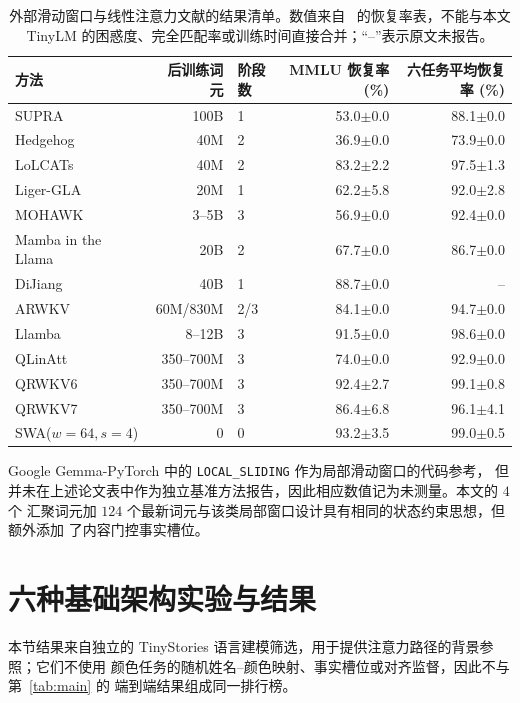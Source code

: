 \documentclass[letterpaper]{article}
\begin{document}
\begin{table}[t]
\centering
\scriptsize
\caption{外部滑动窗口与线性注意力文献的结果清单。数值来自~\cite{jolicoeur2026sliding} 的恢复率表，不能与本文 TinyLM 的困惑度、完全匹配率或训练时间直接合并；“--”表示原文未报告。}
\label{tab:external-swa-list}
\begin{tabular}{l r l r r}
\toprule
方法 & 后训练词元 & 阶段数 & MMLU 恢复率 (\%) & 六任务平均恢复率 (\%) \\
\midrule
SUPRA & 100B & 1 & 53.0$\pm$0.0 & 88.1$\pm$0.0 \\
Hedgehog & 40M & 2 & 36.9$\pm$0.0 & 73.9$\pm$0.0 \\
LoLCATs & 40M & 2 & 83.2$\pm$2.2 & 97.5$\pm$1.3 \\
Liger-GLA & 20M & 1 & 62.2$\pm$5.8 & 92.0$\pm$2.8 \\
MOHAWK & 3--5B & 3 & 56.9$\pm$0.0 & 92.4$\pm$0.0 \\
Mamba in the Llama & 20B & 2 & 67.7$\pm$0.0 & 86.7$\pm$0.0 \\
DiJiang & 40B & 1 & 88.7$\pm$0.0 & -- \\
ARWKV & 60M/830M & 2/3 & 84.1$\pm$0.0 & 94.7$\pm$0.0 \\
Llamba & 8--12B & 3 & 91.5$\pm$0.0 & 98.6$\pm$0.0 \\
QLinAtt & 350--700M & 3 & 74.0$\pm$0.0 & 92.9$\pm$0.0 \\
QRWKV6 & 350--700M & 3 & 92.4$\pm$2.7 & 99.1$\pm$0.8 \\
QRWKV7 & 350--700M & 3 & 86.4$\pm$6.8 & 96.1$\pm$4.1 \\
SWA($w=64,s=4$) & 0 & 0 & 93.2$\pm$3.5 & 99.0$\pm$0.5 \\
\bottomrule
\end{tabular}
\end{table}

Google Gemma-PyTorch 中的 \texttt{LOCAL\_SLIDING} 作为局部滑动窗口的代码参考，
但并未在上述论文表中作为独立基准方法报告，因此相应数值记为未测量。本文的 $4$ 个
汇聚词元加 $124$ 个最新词元与该类局部窗口设计具有相同的状态约束思想，但额外添加
了内容门控事实槽位。

\section{六种基础架构实验与结果}

本节结果来自独立的 TinyStories 语言建模筛选，用于提供注意力路径的背景参照；它们不使用
颜色任务的随机姓名--颜色映射、事实槽位或对齐监督，因此不与第~\ref{tab:main} 的
端到端结果组成同一排行榜。
\end{document}
